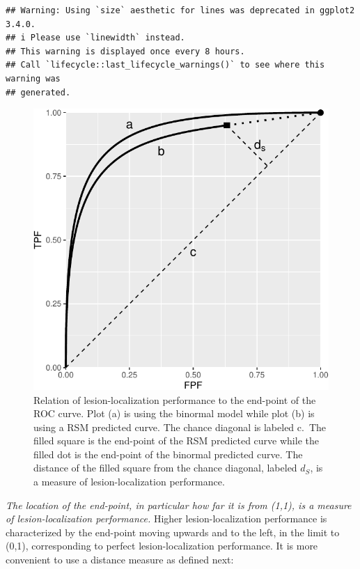 \documentclass[
]{book}
\begin{document}
\begin{verbatim}
## Warning: Using `size` aesthetic for lines was deprecated in ggplot2 3.4.0.
## i Please use `linewidth` instead.
## This warning is displayed once every 8 hours.
## Call `lifecycle::last_lifecycle_warnings()` to see where this warning was
## generated.
\end{verbatim}

\begin{figure}
\centering
\includegraphics{10-rsm-search-classification_files/figure-latex/rsm-search-classification-performance-from-roc-curve-1.pdf}
\caption{\label{fig:rsm-search-classification-performance-from-roc-curve}Relation of lesion-localization performance to the end-point of the ROC curve. Plot (a) is using the binormal model while plot (b) is using a RSM predicted curve. The chance diagonal is labeled c.~The filled square is the end-point of the RSM predicted curve while the filled dot is the end-point of the binormal predicted curve. The distance of the filled square from the chance diagonal, labeled \(d_S\), is a measure of lesion-localization performance.}
\end{figure}

\emph{The location of the end-point, in particular how far it is from (1,1), is a measure of lesion-localization performance.} Higher lesion-localization performance is characterized by the end-point moving upwards and to the left, in the limit to (0,1), corresponding to perfect lesion-localization performance. It is more convenient to use a distance measure as defined next:
\end{document}
